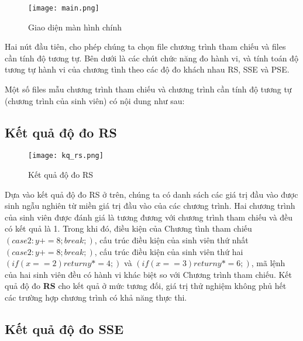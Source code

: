 \begin{center}
  \begin{figure}[H]
    \begin{center}
      \texttt{[image: main.png]}
    \end{center}
    \caption{Giao diện màn hình chính}
  \end{figure}
\end{center}

Hai nút đầu tiên, cho phép chúng ta chọn file chương trình tham chiếu và files cần tính độ tương tự. Bên dưới là các chút chức năng đo hành vi, và tính toán độ tương tự hành vi của chương tình theo các độ đo khách nhau RS, SSE và PSE.

Một số files mẫu chương trình tham chiếu và chương trình cần tính độ tương tự (chương trình của sinh viên) có nội dung như sau:





\subsection{Kết quả độ đo RS}
\begin{center}
  \begin{figure}[H]
    \begin{center}
      \texttt{[image: kq\_rs.png]}
    \end{center}
    \caption{Kết quả độ đo RS}
  \end{figure}
\end{center}

Dựa vào kết quả độ đo RS ở trên, chúng ta có danh sách các giá trị đầu
vào được sinh ngẫu nghiên từ miền giá trị đầu vào của các chương
trình. Hai chương trình của sinh viên được đánh giá là tương đương với
chương trình tham chiếu và đều có kết quả là 1. Trong khi đó, điều
kiện của Chương tình tham chiếu $(case 2: y += 8; break;)$, cấu trúc
điều kiện của sinh viên thứ nhất $(case 2: y += 8; break;)$, cấu trúc
điều kiện của sinh viên thứ hai $(if (x == 2) return y *= 4;)$ và
$(if (x == 3) return y *= 6;)$, mã lệnh của hai sinh viên đều có hành
vi khác biệt so với Chương trình tham chiếu. Kết quả độ đo \textbf{RS}
cho kết quả ở mức tương đối, giá trị thử nghiệm không phủ hết các
trường hợp chương trình có khả năng thực thi.

\subsection{Kết quả độ đo SSE}

